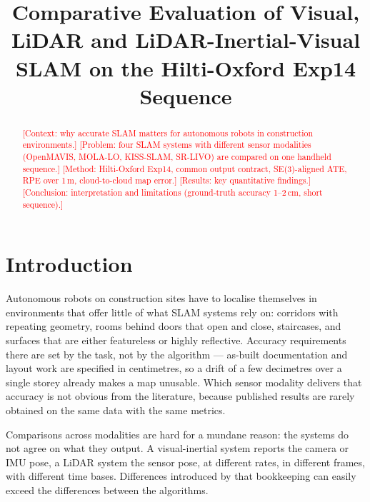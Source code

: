 \documentclass[conference]{IEEEtran}
\newcommand{\todo}[1]{\textcolor{red}{[#1]}}
\begin{document}

\title{Comparative Evaluation of Visual, LiDAR and LiDAR-Inertial-Visual SLAM on the Hilti-Oxford Exp14 Sequence}
\author{\IEEEauthorblockN{Felix \todo{Nachname}, Merle \todo{Nachname}, Rainhard \todo{Nachname}, Victor Swekis}
}

\maketitle

\begin{abstract}
\todo{Context: why accurate SLAM matters for autonomous robots in construction environments.}
\todo{Problem: four SLAM systems with different sensor modalities (OpenMAVIS, MOLA-LO, KISS-SLAM, SR-LIVO) are compared on one handheld sequence.}
\todo{Method: Hilti-Oxford Exp14, common output contract, SE(3)-aligned ATE, RPE over 1\,m, cloud-to-cloud map error.}
\todo{Results: key quantitative findings.}
\todo{Conclusion: interpretation and limitations (ground-truth accuracy 1--2\,cm, short sequence).}
\end{abstract}

\section{Introduction}
Autonomous robots on construction sites have to localise themselves in environments that
offer little of what SLAM systems rely on: corridors with repeating geometry, rooms behind
doors that open and close, staircases, and surfaces that are either featureless or highly
reflective. Accuracy requirements there are set by the task, not by the algorithm --- as-built
documentation and layout work are specified in centimetres, so a drift of a few decimetres
over a single storey already makes a map unusable. Which sensor modality delivers that
accuracy is not obvious from the literature, because published results are rarely obtained
on the same data with the same metrics.

Comparisons across modalities are hard for a mundane reason: the systems do not agree on what
they output. A visual-inertial system reports the camera or IMU pose, a LiDAR system the
sensor pose, at different rates, in different frames, with different time bases. Differences
introduced by that bookkeeping can easily exceed the differences between the algorithms.
\end{document}
